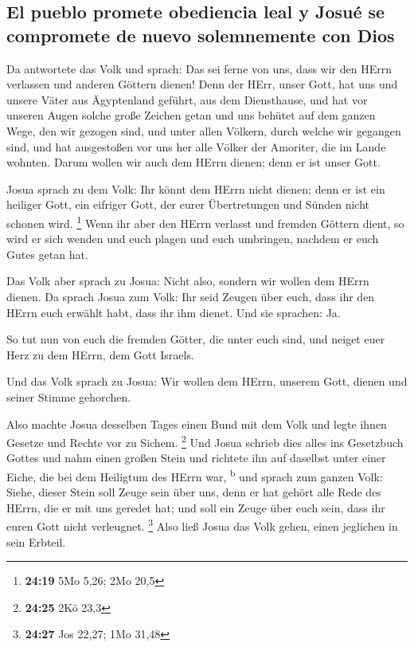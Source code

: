 \hypertarget{el-pueblo-promete-obediencia-leal-y-josuuxe9-se-compromete-de-nuevo-solemnemente-con-dios}{%
\subsection{El pueblo promete obediencia leal y Josué se compromete de
nuevo solemnemente con
Dios}\label{el-pueblo-promete-obediencia-leal-y-josuuxe9-se-compromete-de-nuevo-solemnemente-con-dios}}

 Da antwortete das Volk und sprach: Das sei ferne von
uns, dass wir den HErrn verlassen und anderen Göttern dienen!
 Denn der HErr, unser Gott, hat uns und unsere Väter aus
Ägyptenland geführt, aus dem Diensthause, und hat vor unseren Augen
solche große Zeichen getan und uns behütet auf dem ganzen Wege, den wir
gezogen sind, und unter allen Völkern, durch welche wir gegangen sind,
 und hat ausgestoßen vor uns her alle Völker der
Amoriter, die im Lande wohnten. Darum wollen wir auch dem HErrn dienen;
denn er ist unser Gott.

 Josua sprach zu dem Volk: Ihr könnt dem HErrn nicht
dienen; denn er ist ein heiliger Gott, ein eifriger Gott, der eurer
Übertretungen und Sünden nicht schonen wird. \footnote{\textbf{24:19}
  5Mo 5,26; 2Mo 20,5}  Wenn ihr aber den HErrn verlasst
und fremden Göttern dient, so wird er sich wenden und euch plagen und
euch umbringen, nachdem er euch Gutes getan hat.

 Das Volk aber sprach zu Josua: Nicht also, sondern wir
wollen dem HErrn dienen.  Da sprach Josua zum Volk: Ihr
seid Zeugen über euch, dass ihr den HErrn euch erwählt habt, dass ihr
ihm dienet. Und sie sprachen: Ja.

 So tut nun von euch die fremden Götter, die unter euch
sind, und neiget euer Herz zu dem HErrn, dem Gott Israels.

 Und das Volk sprach zu Josua: Wir wollen dem HErrn,
unserem Gott, dienen und seiner Stimme gehorchen.

 Also machte Josua desselben Tages einen Bund mit dem
Volk und legte ihnen Gesetze und Rechte vor zu Sichem. \footnote{\textbf{24:25}
  2Kö 23,3}  Und Josua schrieb dies alles ins Gesetzbuch
Gottes und nahm einen großen Stein und richtete ihn auf daselbst unter
einer Eiche, die bei dem Heiligtum des HErrn war, \textsuperscript{b}
 und sprach zum ganzen Volk: Siehe, dieser Stein soll
Zeuge sein über uns, denn er hat gehört alle Rede des HErrn, die er mit
uns geredet hat; und soll ein Zeuge über euch sein, dass ihr euren Gott
nicht verleugnet. \footnote{\textbf{24:27} Jos 22,27; 1Mo 31,48}
 Also ließ Josua das Volk gehen, einen jeglichen in sein
Erbteil.

